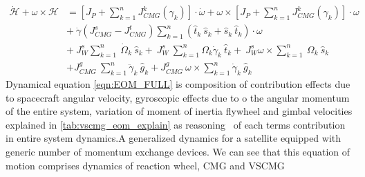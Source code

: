 \begin{equation}
\begin{aligned}
\dot{\mathcal{H}} +\omega \times \mathcal{H} & =
\left[ J_{P} +\sum ^{n}_{k=1} J^{k}_{CMG}( \gamma _{k})\right] \cdotp \dot{\omega }+\omega \times \left[ J_{P} +\sum ^{n}_{k=1} J^{k}_{CMG}( \gamma _{k})\right] \cdotp \omega \\
 & +\ \dot{\gamma }\left( J^{s}_{CMG} -J^{t}_{CMG}\right)\sum ^{n}_{k=1}(\hat{t}_{k} \ \hat{s}_{k} +\hat{s}_{k} \ \hat{t}_{k}) \cdotp \omega \\
 & +\ J^{s}_{W}\sum ^{n}_{k=1} \ \dot{\Omega }_{k} \ \hat{s}_{k} +\ J^{s}_{W} \ \sum ^{n}_{k=1} \Omega _{k}\dot{\gamma }_{k} \ \hat{t}_{k} +\ J^{s}_{W} \omega \times \sum ^{n}_{k=1} \ \Omega _{k} \ \hat{s}_{k}\\
 & +J^{g}_{CMG} \ \sum ^{n}_{k=1}\ddot{\gamma }_{k} \ \hat{g}_{k} +J^{g}_{CMG} \ \omega \times \sum ^{n}_{k=1}\dot{\gamma }_{k} \ \hat{g}_{k}
\end{aligned}
\label{eqn:EOM_FULL}
\end{equation}
Dynamical equation \autoref{eqn:EOM_FULL} is composition of contribution effects due to spacecraft angular velocity, gyroscopic effects due to o the angular momentum of the entire system, variation of moment of inertia flywheel and gimbal velocities explained in \autoref{tab:vscmg_eom_explain} as reasoning \ of each terms contribution in entire system dynamics.A generalized dynamics for a satellite equipped with generic number of momentum exchange devices. We can see that this equation of motion comprises dynamics of reaction wheel, CMG and VSCMG 
